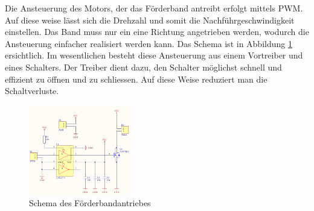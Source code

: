 \label{sec:Foerderband}
    Die Ansteuerung des Motors, der das Förderband antreibt erfolgt mittels PWM. Auf diese 
    weise lässt sich die Drehzahl und somit die Nachführgeschwindigkeit einstellen. Das 
    Band muss nur ein eine Richtung angetrieben werden, wodurch die Ansteuerung einfacher 
    realisiert werden kann. Das Schema ist in Abbildung \ref{abb:SchemaAnsteuerung} 
    ersichtlich. Im wesentlichen besteht diese Ansteuerung aus einem Vortreiber und eines 
    Schalters. Der Treiber dient dazu, den Schalter möglichst schnell und effizient zu 
    öffnen und zu schliessen. Auf diese Weise reduziert man die Schaltverluste. 
    \begin{figure}[h!]
    	\includegraphics[width=0.4\textwidth,clip,trim=0mm 0mm 0mm 0mm]
    	{Enddokumentation/Bilder/Schema_DC-Ansteuerung.png}
    	\centering
    	\caption{Schema des Förderbandantriebes}
    	\label{abb:SchemaAnsteuerung}
    \end{figure}